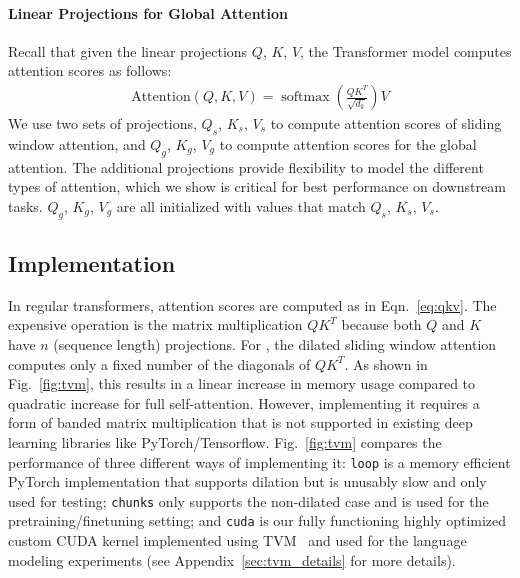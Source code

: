 \paragraph{Linear Projections for Global Attention}
Recall that given the linear projections $Q$, $K$, $V$, the Transformer
model \cite{Vaswani2017AttentionIA} computes attention scores as follows:
\begin{align}
\label{eq:qkv}
\text {Attention}(Q, K, V)=\operatorname{softmax}\left(\frac{Q K^{T}}{\sqrt{d_{k}}}\right) V
\end{align}
We use two sets of projections, $Q_s$, $K_s$, $V_s$ to compute attention scores of sliding window attention, and  $Q_g$, $K_g$, $V_g$ to  compute attention scores for the global attention.
The additional projections provide flexibility to model the different types of attention, which we show is critical for best performance on downstream tasks. 
$Q_g$, $K_g$, $V_g$ are all initialized with values that match
 $Q_s$, $K_s$, $V_s$. 



\subsection{Implementation}
\label{sec:tvm}
In regular transformers, attention scores are computed as in Eqn.~\ref{eq:qkv}. 
The expensive operation is the matrix multiplication $Q K^{T}$ because both
$Q$ and $K$ have $n$ (sequence length) projections. 
For \model, the dilated sliding window attention computes only a fixed number of the diagonals 
of $Q K^{T}$. As shown in Fig.~\ref{fig:tvm}, this results in a linear increase 
in memory usage compared to quadratic increase for full self-attention.
However, implementing it requires a form of banded matrix multiplication that is not supported in 
existing deep learning libraries like PyTorch/Tensorflow.
Fig.~\ref{fig:tvm} compares the performance of three different ways of implementing it:
\texttt{loop} is a memory efficient PyTorch implementation that supports dilation but is unusably slow and only used for testing;
\texttt{chunks} only supports the non-dilated case and is used for 
the pretraining/finetuning setting;
and \texttt{cuda} is our fully functioning highly optimized custom CUDA kernel implemented using TVM~\cite{tvm} and used for the language modeling experiments (see  Appendix~\ref{sec:tvm_details} for more details).
